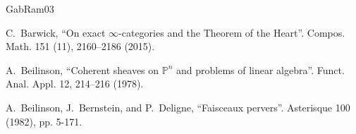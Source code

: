 \documentclass[11pt,leqno]{amsart}
\numberwithin{equation}{section}
\def\PP{{\mathbb P}}
\begin{document}
\begin{thebibliography}{GabRam03}



 C.~Barwick, ``On exact $\infty$-categories and the Theorem of the Heart''. Compos. Math. 151 (11), 2160–2186 (2015).







 A.~Beilinson, “Coherent sheaves on $\PP^n$ and problems of linear algebra”. Funct. Anal. Appl. 12, 214–216 (1978).



 A.~Beilinson, J.~Bernstein, and P.~Deligne, ``Faisceaux pervers''. Asterisque 100 (1982), pp. 5-171.


\end{thebibliography}
\end{document}
